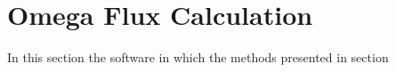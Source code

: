 \section{Omega Flux Calculation}
\label{sec:omega_code}

In this section the software in which the methods presented in section
